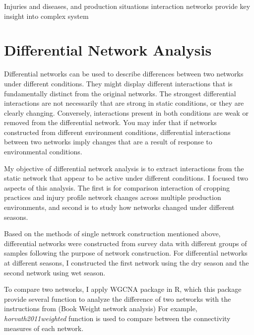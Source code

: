 Injuries and diseases, and production situations interaction networks provide key insight into complex system 

\section*{Differential Network Analysis}  %

Differential networks can be used to describe differences between two networks under different conditions. They might display different interactions that is fundamentally distinct from the original networks. The strongest differential interactions are not necessarily that are strong in static conditions, or they are clearly changing. Conversely, interactions present in both conditions are weak or removed from the differential network. You may infer that if networks constructed from different environment conditions, differential interactions between two networks imply changes that are a result of response to environmental conditions. 

My objective of differential network analysis is to extract interactions from the static network that appear to be active under different conditions. I focused two aspects of this analysis. The first is for comparison interaction of cropping practices and injury profile network changes across multiple production environments, and second is to study how networks changed under different seasons. 

Based on the methods of single network construction mentioned above, differential networks were constructed from survey data with different groups of samples following the purpose of network construction. For differential networks at different seasons, I constructed the first network using the dry season and the second network using wet season. 

To compare two networks, I apply WGCNA package in R, which this package provide several function to analyze the   difference of two networks with the instructions from (Book Weight network analysis) For example, \textit{horvath2011weighted} function is used to compare between the connectivity measures of each network. 



 
